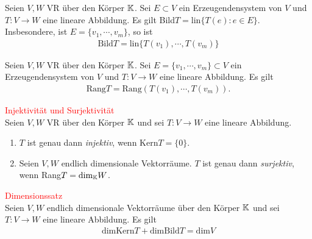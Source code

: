\begin{remark}
Seien $V,W$ VR über den Körper $\mathbb{K}$. Sei $E\subset V$ ein Erzeugendensystem von $V$ und $T:V\to W$ eine lineare Abbildung. Es gilt Bild$T=$lin$\{ T(e):e\in E\}$.
Insbesondere, ist $E=\{v_1,\dotsb,v_m\}$, so ist 
\begin{align*}
    \text{Bild}T=\text{lin}\{T(v_1),\dotsb,T(v_m)\}
\end{align*}
\end{remark}

\begin{corollary}
Seien $V,W$ VR über den Körper $\mathbb{K}$. Sei $E=\{v_1,\dotsb,v_m\}\subset V$ ein Erzeugendensystem von $V$ und $T:V\to W$ eine lineare Abbildung. Es gilt 
\begin{align*}
    \text{Rang}T=\text{Rang}(T(v_1),\dotsb,T(v_m)).
\end{align*}
\end{corollary}

\begin{proposition}
\textcolor{red}{Injektivität und Surjektivität}\\
Seien $V,W$ VR über den Körper $\mathbb{K}$ und sei $T:V\to W$ eine lineare Abbildung.
\begin{enumerate}[1.]
    \item $T$ ist genau dann \textit{injektiv}, wenn Kern$T=\{0\}$.
    \item Seien $V,W$ endlich dimensionale Vektorräume. $T$ ist genau dann \textit{surjektiv}, wenn Rang$T=\text{dim}_{\mathbb{K}} W$.
\end{enumerate}
\end{proposition}

\begin{theorem}
\textcolor{red}{Dimensionssatz}\\
Seien $V,W$ endlich dimensionale Vektorräume über den Körper $\mathbb{K}$ und sei $T:V\to W$ eine lineare Abbildung. Es gilt
\begin{align*}
    \text{dimKern}T+\text{dimBild}T=\text{dim}V
\end{align*}
\end{theorem}